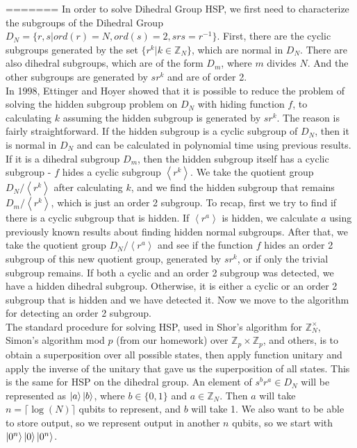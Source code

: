 \documentclass[12pt]{article}
\newcommand{\ceil}[1]{\lceil #1 \rceil}
\theoremstyle{plain}
\theoremstyle{definition}
\begin{document}
=======
In order to solve Dihedral Group HSP, we first need to characterize the subgroups of the Dihedral Group 
$D_N=\lbrace r,s| ord(r)=N,ord(s)=2,srs=r^{-1}\rbrace$.
First, there are the cyclic subgroups generated by the set 
$\lbrace r^k|k\in\mathbb{Z}_N\rbrace$, which are normal in $D_N$.
There are also dihedral subgroups, which are of the form $D_m$, where $m$ divides $N$.
And the other subgroups are generated by $sr^k$ and are of order 2. \\
In 1998, Ettinger and Hoyer	showed that it is possible to reduce the problem of solving the hidden subgroup problem on $D_N$ with hiding function $f$, to calculating $k$ assuming the hidden subgroup is generated by $sr^k$.
The reason is fairly straightforward. If the hidden subgroup is a cyclic subgroup of $D_N$, then it is normal in $D_N$ and can be calculated in polynomial time using previous results.
If it is a dihedral subgroup $D_m$, then the hidden subgroup itself has a cyclic subgroup - $f$ hides a cyclic subgroup $\left<r^k\right>$.
We take the quotient group $D_N/\left<r^k\right>$ after calculating $k$, and we find the hidden subgroup that remains $D_m/\left<r^k\right>$, which is just an order 2 subgroup.
To recap, first we try to find if there is a cyclic subgroup that is hidden. If $\left<r^a\right>$ is hidden, we calculate $a$ using previously known results about finding hidden normal subgroups.
After that, we take the quotient group $D_N/\left<r^a\right>$ and see if the function $f$ hides an order 2 subgroup of this new quotient group, generated by $sr^k$, or if only the trivial subgroup remains.
If both a cyclic and an order 2 subgroup was detected, we have a hidden dihedral subgroup. Otherwise, it is either a cyclic or an order 2 subgroup that is hidden and we have detected it. Now we move to the algorithm for detecting an order 2 subgroup.\\
The standard procedure for solving HSP, used in Shor's algorithm for $\mathbb{Z}^\times_N$, Simon's algorithm mod $p$ (from our homework) over $\mathbb{Z}_p\times\mathbb{Z}_p$, and others, is to obtain a superposition over all possible states, then apply function unitary and apply the inverse of the unitary that gave us the superposition of all states.
This is the same for HSP on the dihedral group. An element of $s^br^a\in D_N$ will be represented as $\left\vert{a}\right\rangle\left\vert{b}\right\rangle$, where $b\in\lbrace 0,1\rbrace$ and $a\in\mathbb{Z}_N$.
Then $a$ will take $n=\ceil{\log(N)}$ qubits to represent, and $b$ will take 1. We also want to be able to store output, so we represent output in another $n$ qubits, so we start with $\left\vert{0^n}\right\rangle\left\vert{0}\right\rangle\left\vert{0^n}\right\rangle$.
\end{document}
